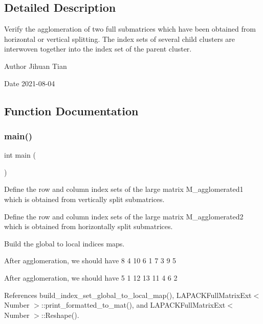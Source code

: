 \subsection{Detailed Description}
Verify the agglomeration of two full submatrices which have been obtained from horizontal or vertical splitting. The index sets of several child clusters are interwoven together into the index set of the parent cluster. 

\begin{DoxyAuthor}{Author}
Jihuan Tian 
\end{DoxyAuthor}
\begin{DoxyDate}{Date}
2021-\/08-\/04 
\end{DoxyDate}


\subsection{Function Documentation}
\mbox{\label{lapack-matrix-agglomeration-of-two-submatrices-interwoven-indices_8cc_ae66f6b31b5ad750f1fe042a706a4e3d4}} 
\subsubsection{\texorpdfstring{main()}{main()}}
{\footnotesize\ttfamily int main (\begin{DoxyParamCaption}{ }\end{DoxyParamCaption})}

Define the row and column index sets of the large matrix {\ttfamily M\+\_\+agglomerated1} which is obtained from vertically split submatrices.

Define the row and column index sets of the large matrix {\ttfamily M\+\_\+agglomerated2} which is obtained from horizontally split submatrices.

Build the global to local indices maps.

After agglomeration, we should have { 8 4 10 6 1 7 3 9 5 }

After agglomeration, we should have { 5 1 12 13 11 4 6 2 }

References build\+\_\+index\+\_\+set\+\_\+global\+\_\+to\+\_\+local\+\_\+map(), L\+A\+P\+A\+C\+K\+Full\+Matrix\+Ext$<$ Number $>$\+::print\+\_\+formatted\+\_\+to\+\_\+mat(), and L\+A\+P\+A\+C\+K\+Full\+Matrix\+Ext$<$ Number $>$\+::\+Reshape().

